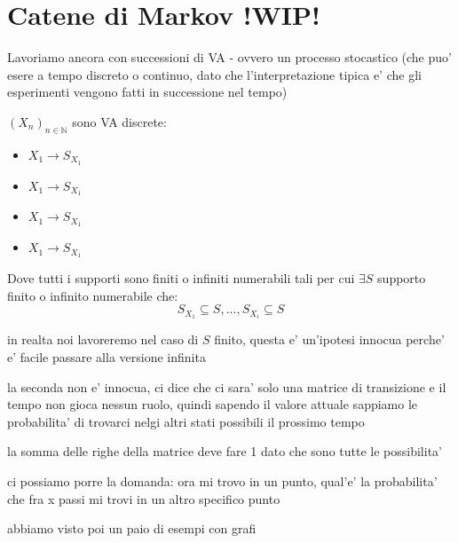 % 
\chapter{Catene di Markov !WIP!}
Lavoriamo ancora con successioni di VA - ovvero un processo stocastico (che puo' esere a tempo discreto o continuo, dato che l'interpretazione tipica e' che gli esperimenti vengono fatti in successione nel tempo) 

$ (X_n)_{n \in \mathbb{N}} $ sono VA discrete:
\begin{itemize}
\item $ X_1 \to S_{X_1} $
\item $ X_1 \to S_{X_1} $
\item $ X_1 \to S_{X_1} $
\item $ X_1 \to S_{X_1} $
\end{itemize}

Dove tutti i supporti sono finiti o infiniti numerabili tali per cui $ \exists S  $ supporto finito o infinito numerabile che:
\[
S_{X_1} \subseteq S, ..., S_{X_i} \subseteq S
\]

in realta noi lavoreremo nel caso di $ S  $ finito, questa e' un'ipotesi innocua perche' e' facile passare alla versione infinita

la seconda non e' innocua, ci dice che ci sara' solo una matrice di transizione e il tempo non gioca nessun ruolo, quindi sapendo il valore attuale sappiamo le probabilita' di trovarci nelgi altri stati possibili il prossimo tempo

la somma delle righe della matrice deve fare 1 dato che sono tutte le possibilita'

ci possiamo porre la domanda: ora mi trovo in un punto, qual'e' la probabilita' che fra x passi mi trovi in un altro specifico punto

abbiamo visto poi un paio di esempi con grafi

